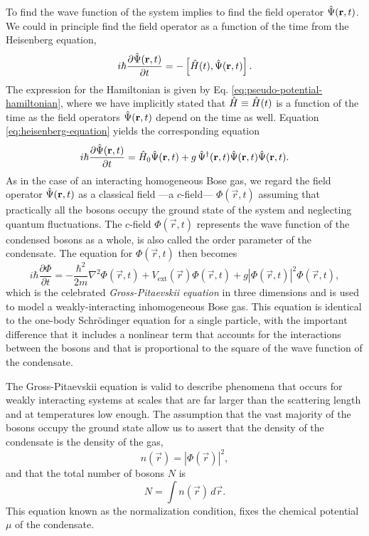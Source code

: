 To find the wave function of the system implies to find the field operator ${\hat{\Psi}}(\mathbf r, t)$. We could in
principle find the field operator as a function of the time from the Heisenberg equation,
%
\begin{equation}
	\label{eq:heisenberg-equation}
    i \hbar \frac{\partial {\hat{\Psi}}(\mathbf r, t)}{\partial t} = -\left[{\hat{H}}(t), {\hat{\Psi}}(\mathbf r, t)\right].
\end{equation}
%
The expression for the Hamiltonian is given by Eq. \eqref{eq:pseudo-potential-hamiltonian}, where we have implicitly stated that ${\hat{H}} \equiv {\hat{H}}(t)$ is a function of the time as the field operators
${\hat{\Psi}}(\mathbf r, t)$ depend on the time as well. Equation \eqref{eq:heisenberg-equation} yields the
corresponding
equation
%
\begin{equation}
	\label{eq:gross-pitaevskii-heisenberg-equation}
    i\hbar \frac{\partial {\hat{\Psi}}(\mathbf r, t)}{\partial t} = {\hat{H}}_0 {\hat{\Psi}}(\mathbf r, t) +
    g \, {\hat{\Psi}}^\dagger(\mathbf r, t) {\hat{\Psi}}(\mathbf r, t) {\hat{\Psi}}(\mathbf r, t).
\end{equation}
%
As in the case of an interacting homogeneous Bose gas, we regard the field operator ${\hat{\Psi}}(\mathbf r, t)$ as a
classical field ---a $c$-field--- $\Phi(\vec r, t)$ assuming that practically all the bosons occupy the ground state of
the system and neglecting quantum fluctuations. The $c$-field $\Phi(\vec r, t)$ represents the  wave function of the
condensed bosons as a whole, is also called the order parameter of the condensate. The equation for
$\Phi(\vec r, t)$ then becomes
%
\begin{equation}
    \label{eq:gross-pitaevskii-equation-3d}
    i\hbar \frac{\partial \Phi}{\partial t} = -\frac{\hbar^2}{2m} \nabla^2 \Phi(\vec r, t) +
    V_\mathrm{ext}(\vec r) \Phi(\vec r, t) +
    g \left| \Phi(\vec r, t) \right|^2 \Phi(\vec r, t),
\end{equation}
%
which is the celebrated \textit{Gross-Pitaevskii equation} \cite{bib:gross-il-nuovo-cimento.1961, bib:pitaevskii-jetp.1961} in three dimensions and is used to model a weakly-interacting inhomogeneous Bose gas. This equation is identical to the one-body
Schrödinger equation for a single particle, with the important difference that it includes a nonlinear term that
accounts for the interactions between the bosons and that is proportional to the square of the wave function of the
condensate.

The Gross-Pitaevskii equation is valid to describe phenomena that occurs for weakly interacting systems at scales that
are far larger than the scattering length and at temperatures low enough. The assumption that the vast majority of the bosons occupy the ground state allow us to assert that the density of the condensate is the density of the gas,
%
\begin{equation}
\textit{}   n(\vec r) = \left| \Phi(\vec r) \right|^2,
\end{equation}
%
and that the total number of bosons $N$ is
%
\begin{equation}
    N = \int n(\vec r) \, d\vec r.
\end{equation}
%
This equation known as the normalization condition, fixes the chemical potential $\mu$ of the condensate.

